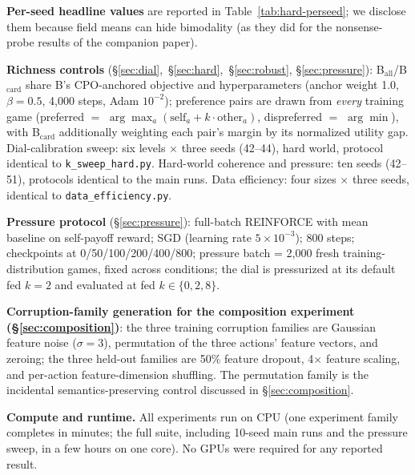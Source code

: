 \documentclass[11pt]{article}
\begin{document}
\textbf{Per-seed headline values} are reported in Table~\ref{tab:hard-perseed}; we
disclose them because field means can hide bimodality (as they did for the nonsense-probe
results of the companion paper).

\textbf{Richness controls} (\S\ref{sec:dial},~\S\ref{sec:hard},~\S\ref{sec:robust},
\S\ref{sec:pressure}): B$_{\mathrm{all}}$/B$_{\mathrm{card}}$ share B's CPO-anchored objective
and hyperparameters (anchor weight 1.0, $\beta{=}0.5$, 4{,}000 steps, Adam $10^{-2}$);
preference pairs are drawn from \emph{every} training game (preferred $=$
$\arg\max_a(\mathrm{self}_a + k\cdot\mathrm{other}_a)$, dispreferred $=$ $\arg\min$), with
B$_{\mathrm{card}}$ additionally weighting each pair's margin by its normalized utility gap.
Dial-calibration sweep: six levels $\times$ three seeds (42--44), hard world, protocol identical
to \texttt{k\_sweep\_hard.py}. Hard-world coherence and pressure: ten seeds (42--51), protocols
identical to the main runs. Data efficiency: four sizes $\times$ three seeds, identical to
\texttt{data\_efficiency.py}.

\textbf{Pressure protocol} (\S\ref{sec:pressure}): full-batch REINFORCE with mean baseline on
self-payoff reward; SGD (learning rate $5\times10^{-3}$); 800 steps; checkpoints at
0/50/100/200/400/800; pressure batch = 2{,}000 fresh training-distribution games, fixed across
conditions; the dial is pressurized at its default fed $k{=}2$ and evaluated at fed
$k \in \{0, 2, 8\}$.

\textbf{Corruption-family generation for the composition experiment (\S\ref{sec:composition})}: the three training
corruption families are Gaussian feature noise ($\sigma{=}3$), permutation of the three
actions' feature vectors, and zeroing; the three held-out families are 50\% feature dropout,
4$\times$ feature scaling, and per-action feature-dimension shuffling. The permutation family
is the incidental semantics-preserving control discussed in \S\ref{sec:composition}.

\textbf{Compute and runtime.} All experiments run on CPU (one experiment family completes in
minutes; the full suite, including 10-seed main runs and the pressure sweep, in a few hours on
one core). No GPUs were required for any reported result.
\end{document}
